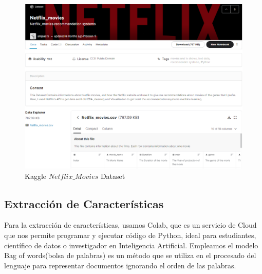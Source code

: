 \documentclass{article}
\begin{document}
            \begin{figure}[H]
    			\centering
    			\includegraphics[scale=0.45]{img/netflix1.PNG}
    			\caption{Kaggle $Netflix\_Movies$ Dataset}
    			\label{fig:netflix1}
    		\end{figure}
    		
    	\subsection{Extracción de Características}
    	Para la extracción de características, usamos Colab, que es un servicio de Cloud que nos permite programar y ejecutar código de Python, ideal para estudiantes, científico de datos o investigador en Inteligencia Artificial.
    	Empleamos el modelo Bag of words(bolsa de palabras) es un método que se utiliza en el procesado del lenguaje para representar documentos ignorando el orden de las palabras.
    	
\end{document}
